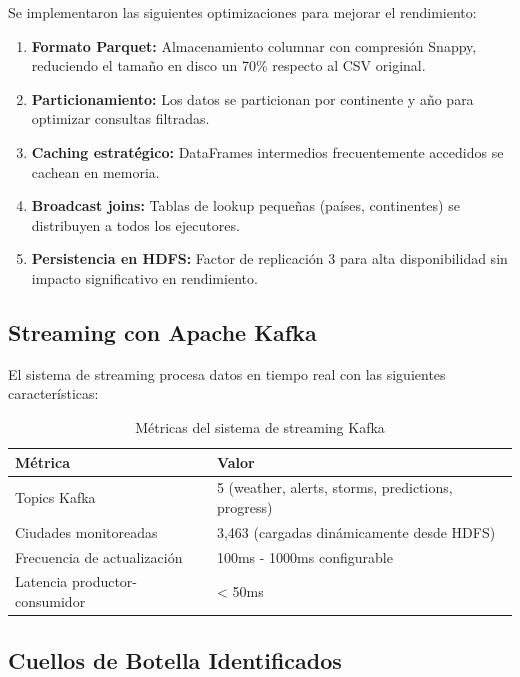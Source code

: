 \documentclass[12pt,a4paper]{scrartcl}
\begin{document}
Se implementaron las siguientes optimizaciones para mejorar el rendimiento:

\begin{enumerate}
    \item \textbf{Formato Parquet:} Almacenamiento columnar con compresión Snappy, reduciendo el tamaño en disco un 70\% respecto al CSV original.
    
    \item \textbf{Particionamiento:} Los datos se particionan por continente y año para optimizar consultas filtradas.
    
    \item \textbf{Caching estratégico:} DataFrames intermedios frecuentemente accedidos se cachean en memoria.
    
    \item \textbf{Broadcast joins:} Tablas de lookup pequeñas (países, continentes) se distribuyen a todos los ejecutores.
    
    \item \textbf{Persistencia en HDFS:} Factor de replicación 3 para alta disponibilidad sin impacto significativo en rendimiento.
\end{enumerate}

\subsection{Streaming con Apache Kafka}

El sistema de streaming procesa datos en tiempo real con las siguientes características:

\begin{table}[h]
\centering
\begin{tabular}{@{}ll@{}}
\toprule
\textbf{Métrica} & \textbf{Valor} \\
\midrule
Topics Kafka & 5 (weather, alerts, storms, predictions, progress) \\
Ciudades monitoreadas & 3,463 (cargadas dinámicamente desde HDFS) \\
Frecuencia de actualización & 100ms - 1000ms configurable \\
Latencia productor-consumidor & < 50ms \\
\bottomrule
\end{tabular}
\caption{Métricas del sistema de streaming Kafka}
\end{table}

\subsection{Cuellos de Botella Identificados}
\end{document}
